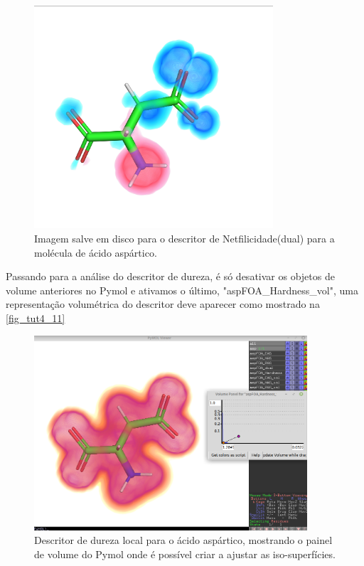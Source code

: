 \documentclass[a4paper,11pt]{refart}
\begin{document}
\hspace*{-\leftmarginwidth}
\begin{minipage}{\fullwidth}
	\begin{figure}[H]
		\begin{center}
			\includegraphics[width=3.5in]{images/tut4_img11}
			\caption{Imagem salve em disco para o descritor de Netfilicidade(dual) para a molécula de ácido aspártico.}
			\label{fig_tut4_9}
		\end{center}
	\end{figure}
\end{minipage}

Passando para a análise do descritor de dureza, é só desativar os objetos de volume anteriores no Pymol e ativamos o último, "aspFOA\_Hardness\_vol", uma representação volumétrica do descritor deve aparecer como mostrado na \autoref{fig_tut4_11}


\hspace*{-\leftmarginwidth}
\begin{minipage}{\fullwidth}
	\begin{figure}[H]
		\begin{center}
			\includegraphics[width=4in]{images/tut4_img13}
			\caption{Descritor de dureza local para o ácido aspártico, mostrando o painel de volume do Pymol onde é possível criar a ajustar as iso-superfícies.}
			\label{fig_tut4_11}
		\end{center}
	\end{figure}
\end{minipage}
\end{document}

